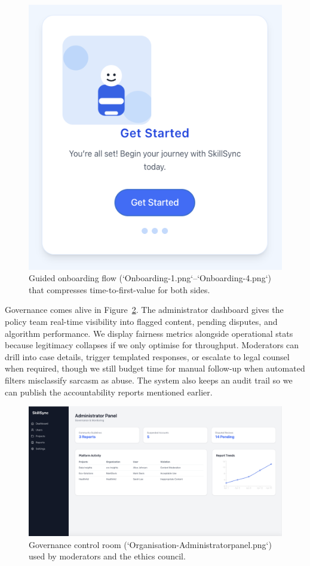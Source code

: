 \begin{figure}[h]
\begin{minipage}[b]{0.3\linewidth}
    \includegraphics[width=\linewidth]{figures/Onboarding-4.png}
  \end{minipage}
  \caption{Guided onboarding flow (`Onboarding-1.png`--`Onboarding-4.png`) that compresses time-to-first-value for both sides.}
  \label{fig:onboarding-flow}
\end{figure}

Governance comes alive in Figure~\ref{fig:admin-panel}. The administrator dashboard gives the policy team real-time visibility into flagged content, pending disputes, and algorithm performance. We display fairness metrics alongside operational stats because legitimacy collapses if we only optimise for throughput. Moderators can drill into case details, trigger templated responses, or escalate to legal counsel when required, though we still budget time for manual follow-up when automated filters misclassify sarcasm as abuse. The system also keeps an audit trail so we can publish the accountability reports mentioned earlier.

\begin{figure}[h]
  \centering
  \includegraphics[width=0.85\linewidth]{figures/Organisation-Administratorpanel.png}
  \caption{Governance control room (`Organisation-Administratorpanel.png`) used by moderators and the ethics council.}
  \label{fig:admin-panel}
\end{figure}

